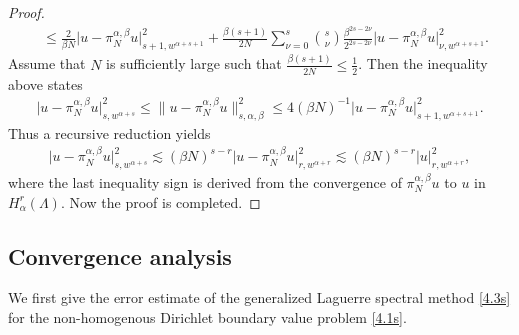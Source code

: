 \documentclass[10pt,reqno]{amsart}
\theoremstyle{remark}
\theoremstyle{definition}
\begin{document}
\begin{proof}
\begin{align*}
&
\le \frac{2}{ \beta N} \big|u-\pi^{\alpha,\beta}_Nu \big|^2_{s+1,w^{\alpha+s+1}}
 + \frac{\beta (s+1)}{ 2 N }   \sum_{\nu=0}^{s} \binom{s}{\nu} \frac{\beta^{2s-2\nu}}{2^{2s-2\nu}}  \big|u-\pi^{\alpha,\beta}_Nu \big|^2_{\nu, w^{\alpha+s+1}}.
\end{align*}
Assume that $N$ is sufficiently large such that $\frac{\beta (s+1)}{ 2 N } \le \frac12$.  Then the inequality  above  states
\begin{align*}
\big|u-\pi^{\alpha,\beta}_Nu \big|^2_{s, w^{\alpha+s}} \le \|u-\pi^{\alpha,\beta}_Nu\|_{s, \alpha,\beta}^2  \le 4 (\beta N)^{-1} \big|u-\pi^{\alpha,\beta}_Nu \big|^2_{s+1, w^{\alpha+s+1}} .
\end{align*}
Thus a recursive reduction yields
\begin{align*}
\big|u-\pi^{\alpha,\beta}_Nu \big|^2_{s, w^{\alpha+s}}   \lesssim (\beta N)^{s-r} \big|u-\pi^{\alpha,\beta}_Nu \big|^2_{r, w^{\alpha+r}}
\lesssim (\beta N)^{s-r} \big|u\big|^2_{r, w^{\alpha+r}} ,
\end{align*}
where the last inequality sign is derived from  the convergence of $\pi_N^{\alpha,\beta}u$ to $u$ in $H^r_{\alpha}(\Lambda)$.
Now the proof is completed.
\fi
\end{proof}
\subsection{Convergence analysis}
We first give the error estimate of the generalized Laguerre spectral method
\eqref{4.3s} for the non-homogenous  Dirichlet boundary value problem \eqref{4.1s}.
\end{document}
